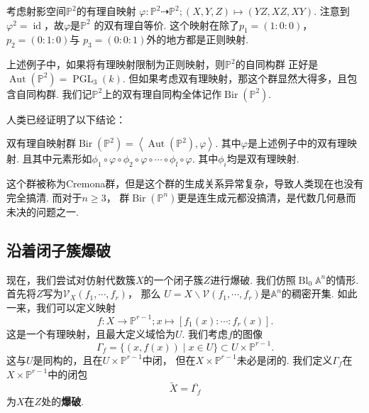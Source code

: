     \begin{example}
        考虑射影空间$\mathbb{P}^{2}$的有理自映射
        $\varphi\colon\mathbb{P}^{2} \dashrightarrow \mathbb{P}^{2};
        (X,Y,Z) \mapsto (YZ,XZ,XY)$.
        注意到$\varphi^{2} = \operatorname{id}$，故$\varphi$是$\mathbb{P}^{2}$
        的双有理自等价. 这个映射在除了$p_{1}=(1:0:0)$，$p_{2}=(0:1:0)$与
        $p_{3}=(0:0:1)$外的地方都是正则映射.
    \end{example}

    上述例子中，如果将有理映射限制为正则映射，则$\mathbb{P}^{2}$的自同构群
    正好是$\operatorname{Aut}(\mathbb{P}^{2}) = \operatorname{PGL}_{3}(k)$.
    但如果考虑双有理映射，那这个群显然大得多，且包含自同构群. 
    我们记$\mathbb{P}^{2}$上的双有理自同构全体记作$\operatorname{Bir}(\mathbb{P}^{2})$.
    
    人类已经证明了以下结论：

    \begin{theorem}
        双有理自映射群$\operatorname{Bir}(\mathbb{P}^{2})=\left<\operatorname{Aut}(\mathbb{P}^{2}),\varphi\right>$.
        其中$\varphi$是上述例子中的双有理映射. 
        且其中元素形如$\phi_{1} \circ \varphi \circ \phi_{2} \circ \varphi \circ \cdots \circ \phi_{l} \circ \varphi$.
        其中$\phi_{i}$均是双有理映射.
    \end{theorem}

    这个群被称为Cremona群，但是这个群的生成关系异常复杂，导致人类现在也没有完全搞清. 而对于$n \geq 3$，
    群$\operatorname{Bir}(\mathbb{P}^{n})$更是连生成元都没搞清，是代数几何悬而未决的问题之一.

    \subsection{沿着闭子簇爆破}
    现在，我们尝试对仿射代数簇$X$的一个闭子簇$Z$进行爆破. 
    我们仿照$\operatorname{Bl}_{0}\mathbb{A}^{n}$的情形.
    首先将$Z$写为$\mathcal{V}_{X}(f_{1},\cdots,f_{r})$，
    那么
    $U = X\backslash\mathcal{V}(f_{1},\cdots,f_{r})$是$\mathbb{A}^{n}$的稠密开集.
    如此一来，我们可以定义映射
    \[f\colon X \to \mathbb{P}^{r-1};x \mapsto [f_{1}(x):\cdots:f_{r}(x)].\]
    这是一个有理映射，且最大定义域恰为$U$.
    我们考虑$f$的图像
    \[\Gamma_{f} = \{(x,f(x))\mid x \in U\} \subset U \times \mathbb{P}^{r-1}.\]
    这与$U$是同构的，且在$U \times \mathbb{P}^{r-1}$中闭，
    但在$X \times \mathbb{P}^{r-1}$未必是闭的. 
    我们定义$\Gamma_{f}$在$X \times \mathbb{P}^{r-1}$中的闭包
    \[\widetilde{X} = \overline{\Gamma_{f}}\]
    为$X$在$Z$处的\textbf{爆破}.

